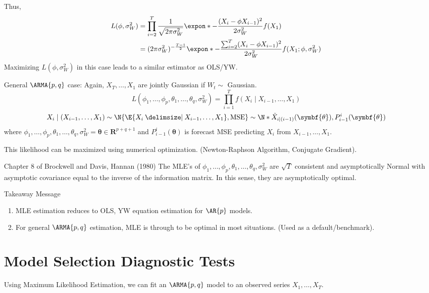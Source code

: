 Thus,
\begin{align*}
    L(\phi,\sigma_W^2)
     & = \prod_{i=2}^T \frac{1}{\sqrt{2\pi\sigma_W^2}}\expon*{-\frac{(X_i-\phi X_{i-1})^2}{2\sigma_W^2} }f(X_1)                   \\
     & = (2\pi\sigma_W^2)^{-\frac{T-1}{2}}\expon*{-\frac{\sum_{i=2}^{T} (X_i-\phi X_{i-1})^2}{2\sigma_W^2}}f(X_1;\phi,\sigma_W^2)
\end{align*}
Maximizing $ L(\phi,\sigma_W^2) $ in this case leads to a similar estimator as OLS/YW\@.

General $ \ARMA{p,q} $ case: Again, $ X_T,\ldots,X_1 $ are jointly
Gaussian if $ W_t \sim  $ Gaussian.
\[ L(\phi_1,\ldots,\phi_p,\theta_1,\ldots,\theta_q,\sigma_W^2)=
    \prod_{i=1}^T f(X_i\mid X_{i-1},\ldots,X_1) \]
\[ X_i\mid (X_{i-1},\ldots,X_1)\sim \N{\E{X_i\given X_{i-1},\ldots,X_1},\text{MSE}}
    \sim \N*{\tilde{X}_{i\mid (i-1)}(\symbf{\theta}),P_{i-1}^i(\symbf{\theta})} \]
where $ \phi_1,\ldots,\phi_p,\theta_1,\ldots,\theta_q,\sigma_W^2=\symbf{\theta}\in\mathbf{R}^{p+q+1} $
and $ P_{i-1}^i(\symbf{\theta}) $ is forecast MSE predicting $ X_i $ from $ X_{i-1},\ldots,X_1 $.

This likelihood can be maximized using numerical optimization. (Newton-Raphson Algorithm,
Conjugate Gradient).

\begin{Theorem}{Chapter 8 of Brockwell and Davis, Hannan (1980)}{}
    The MLE's of $ \phi_1,\ldots,\phi_p,\theta_1,\ldots,\theta_q,\sigma_W^2 $
    are $ \sqrt{T} $ consistent and asymptotically Normal with asymptotic covariance
    equal to the inverse of the information matrix. In this sense, they
    are asymptotically optimal.
\end{Theorem}
\begin{Remark}{Takeaway Message}{}
    \begin{enumerate}[(1)]
        \item MLE estimation reduces to OLS, YW equation estimation for $ \AR{p} $ models.
        \item For general $ \ARMA{p,q} $ estimation, MLE
              is through to be optimal in most situations. (Used as a default/benchmark).
    \end{enumerate}
\end{Remark}

\section{Model Selection Diagnostic Tests}
Using Maximum Likelihood Estimation, we can fit an $ \ARMA{p,q} $
model to an observed series $ X_1,\ldots ,X_T $.

